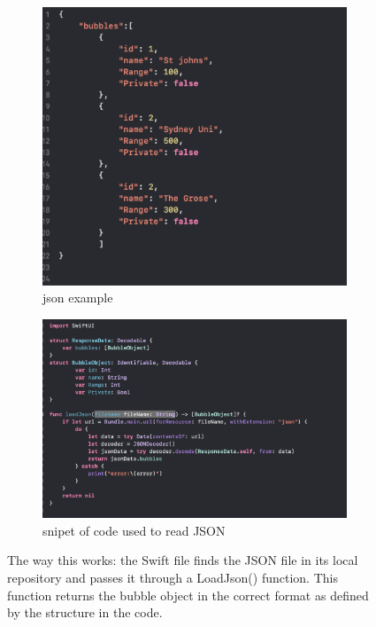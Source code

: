 \documentclass[a4paper, 11pt]{report}
\begin{document}
\begin{figure}
  \begin{subfigure}[h]{0.5\textwidth}
    \includegraphics[width=\textwidth]{json.png}
    \caption{json example}
    \label{fig:image1}
  \end{subfigure}
  \hfill
  \begin{subfigure}[h]{0.6\textwidth}
    \includegraphics[width=\textwidth]{readjson.png}
    \caption{snipet of code used to read JSON}
    \label{fig:image2}
  \end{subfigure}
  \caption{
The way this works: the Swift file finds the JSON file in its local repository and passes it through a LoadJson() function. This function returns the bubble object in the correct format as defined by the structure in the code.\\
}


\end{figure}
\end{document}
